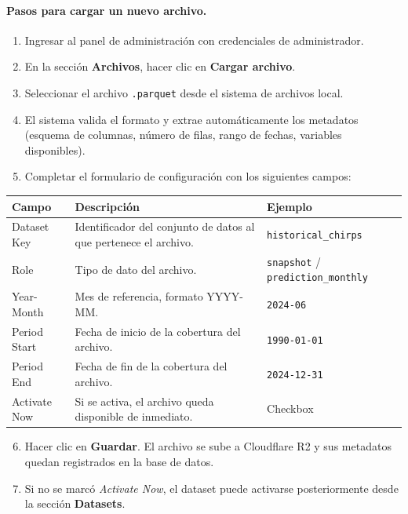 \paragraph{Pasos para cargar un nuevo archivo.}

\begin{enumerate}
    \item Ingresar al panel de administración con credenciales de administrador.
    \item En la sección \textbf{Archivos}, hacer clic en \textbf{Cargar archivo}.
    \item Seleccionar el archivo \texttt{.parquet} desde el sistema de archivos local.
    \item El sistema valida el formato y extrae automáticamente los metadatos (esquema de columnas, número de filas, rango de fechas, variables disponibles).
    \item Completar el formulario de configuración con los siguientes campos:
\end{enumerate}

\begin{center}
\small
\begin{tabular}{@{}lp{4.8cm}l@{}}
\toprule
\textbf{Campo} & \textbf{Descripción} & \textbf{Ejemplo} \\
\midrule
Dataset Key  & Identificador del conjunto de datos al que pertenece el archivo. & \texttt{historical\_chirps} \\
Role         & Tipo de dato del archivo. & \texttt{snapshot} / \texttt{prediction\_monthly} \\
Year-Month   & Mes de referencia, formato YYYY-MM. & \texttt{2024-06} \\
Period Start & Fecha de inicio de la cobertura del archivo. & \texttt{1990-01-01} \\
Period End   & Fecha de fin de la cobertura del archivo. & \texttt{2024-12-31} \\
Activate Now & Si se activa, el archivo queda disponible de inmediato. & Checkbox \\
\bottomrule
\end{tabular}
\end{center}

\begin{enumerate}
\setcounter{enumi}{5}
    \item Hacer clic en \textbf{Guardar}. El archivo se sube a Cloudflare R2 y sus metadatos quedan registrados en la base de datos.
    \item Si no se marcó \textit{Activate Now}, el dataset puede activarse posteriormente desde la sección \textbf{Datasets}.
\end{enumerate}

